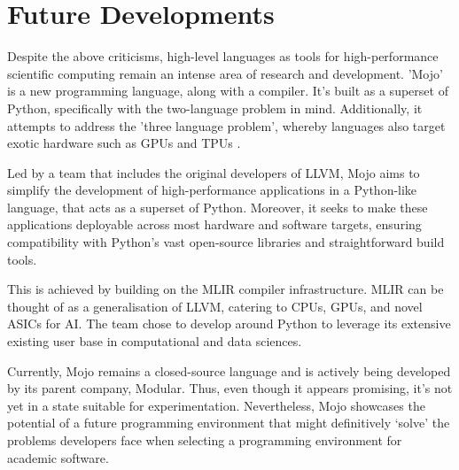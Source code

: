 \section{Future Developments}\label{chpt:1:sec:3}

Despite the above criticisms, high-level languages as tools for high-performance scientific computing remain an intense area of research and development. 'Mojo' is a new programming language, along with a compiler. It's built as a superset of Python, specifically with the two-language problem in mind. Additionally, it attempts to address the 'three language problem', whereby languages also target exotic hardware such as GPUs and TPUs \cite{Lattner2023Mojo}.

Led by a team that includes the original developers of LLVM, Mojo aims to simplify the development of high-performance applications in a Python-like language, that acts as a superset of Python. Moreover, it seeks to make these applications deployable across most hardware and software targets, ensuring compatibility with Python's vast open-source libraries and straightforward build tools.

This is achieved by building on the MLIR compiler infrastructure. MLIR can be thought of as a generalisation of LLVM, catering to CPUs, GPUs, and novel ASICs for AI. The team chose to develop around Python to leverage its extensive existing user base in computational and data sciences.

Currently, Mojo remains a closed-source language and is actively being developed by its parent company, Modular. Thus, even though it appears promising, it's not yet in a state suitable for experimentation. Nevertheless, Mojo showcases the potential of a future programming environment that might definitively `solve' the problems developers face when selecting a programming environment for academic software.